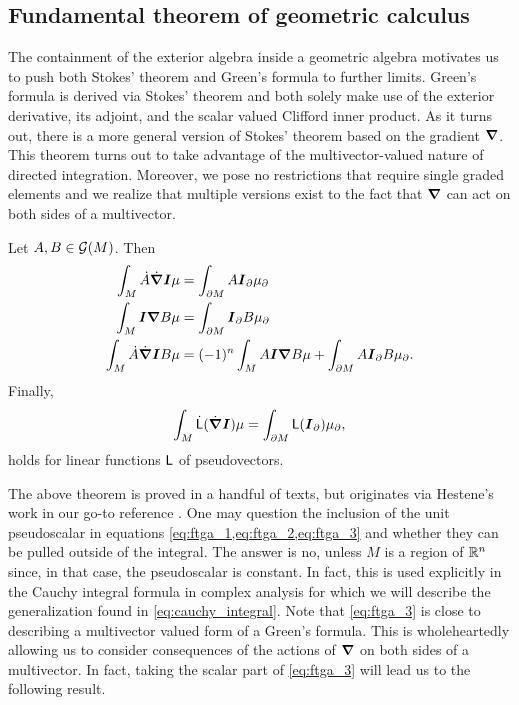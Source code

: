 \subsection{Fundamental theorem of geometric calculus}
\label{subsec:ftgc}

The containment of the exterior algebra inside a geometric algebra motivates us to push both Stokes' theorem and Green's formula to further limits. Green's formula is derived via Stokes' theorem and both solely make use of the exterior derivative, its adjoint, and the scalar valued Clifford inner product. As it turns out, there is a more general version of Stokes' theorem based on the gradient $\boldsymbol{\nabla}$. This theorem turns out to take advantage of the multivector-valued nature of directed integration. Moreover, we pose no restrictions that require single graded elements and we realize that multiple versions exist to the fact that $\boldsymbol{\nabla}$ can act on both sides of a multivector.

\begin{theorem}
\label{thm:ftga}
Let $A,B\in \mathcal{G}(M)$. Then
\begin{align}
\label{eq:ftga_1}
\int_M \dot{A}\dot{\boldsymbol{\nabla}} \boldsymbol{I}\mu &= \int_{\partial M}  A \boldsymbol{I}_\partial \mu_\partial\\
\label{eq:ftga_2}
\int_M  \boldsymbol{I} \boldsymbol{\nabla} B \mu &= \int_{\partial M} \boldsymbol{I}_\partial B \mu_\partial\\
\label{eq:ftga_3}
\int_M  \dot{A}\dot{\boldsymbol{\nabla}} \boldsymbol{I} B\mu &= (-1)^{n}\int_M A \boldsymbol{I} \boldsymbol{\nabla} B\mu + \int_{\partial M} A \boldsymbol{I}_\partial B \mu_\partial.
\end{align}
Finally,
\begin{equation}
\label{eq:ftga_4}
\int_M \dot{\sf{L}}(\dot{\boldsymbol{\nabla}} \boldsymbol{I})\mu = \int_{\partial M} \sf{L}(\boldsymbol{I}_\partial)\mu_\partial,
\end{equation}
holds for linear functions $\sf{L}$ of pseudovectors.
\end{theorem}
The above theorem is proved in a handful of texts, but originates via Hestene's work in our go-to reference \cite{hestenes_clifford_1984}. One may question the inclusion of the unit pseudoscalar in equations \cref{eq:ftga_1,eq:ftga_2,eq:ftga_3} and whether they can be pulled outside of the integral. The answer is no, unless $M$ is a region of $\mathbb{R}^n$ since, in that case, the pseudoscalar is constant. In fact, this is used explicitly in the Cauchy integral formula in complex analysis for which we will describe the generalization found in \cref{eq:cauchy_integral}. Note that \cref{eq:ftga_3} is close to describing a multivector valued form of a Green's formula. This is wholeheartedly allowing us to consider consequences of the actions of $\boldsymbol{\nabla}$ on both sides of a multivector. In fact, taking the scalar part of \cref{eq:ftga_3} will lead us to the following result.

